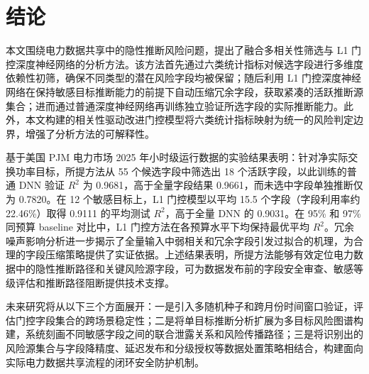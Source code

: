 \documentclass[UTF8,zihao=5,twoside]{ctexart}
\numberwithin{equation}{section}
\begin{document}
\section{结论}
本文围绕电力数据共享中的隐性推断风险问题，提出了融合多相关性筛选与 L1 门控深度神经网络的分析方法。该方法首先通过六类统计指标对候选字段进行多维度依赖性初筛，确保不同类型的潜在风险字段均被保留；随后利用 L1 门控深度神经网络在保持敏感目标推断能力的前提下自动压缩冗余字段，获取紧凑的活跃推断源集合；进而通过普通深度神经网络再训练独立验证所选字段的实际推断能力。此外，本文构建的相关性驱动改进门控模型将六类统计指标映射为统一的风险判定边界，增强了分析方法的可解释性。

基于美国 PJM 电力市场 2025 年小时级运行数据的实验结果表明：针对净实际交换功率目标，所提方法从 55 个候选字段中筛选出 18 个活跃字段，以此训练的普通 DNN 验证 $R^2$ 为 0.9681，高于全量字段结果 0.9661，而未选中字段单独推断仅为 0.7820。在 12 个敏感目标上，L1 门控模型以平均 15.5 个字段（字段利用率约 22.46\%）取得 0.9111 的平均测试 $R^2$，高于全量 DNN 的 0.9031。在 95\% 和 97\% 同预算 baseline 对比中，L1 门控方法在各预算水平下均保持最优平均 $R^2$。冗余噪声影响分析进一步揭示了全量输入中弱相关和冗余字段引发过拟合的机理，为合理的字段压缩策略提供了实证依据。上述结果表明，所提方法能够有效定位电力数据中的隐性推断路径和关键风险源字段，可为数据发布前的字段安全审查、敏感等级评估和推断路径阻断提供技术支撑。

未来研究将从以下三个方面展开：一是引入多随机种子和跨月份时间窗口验证，评估门控字段集合的跨场景稳定性；二是将单目标推断分析扩展为多目标风险图谱构建，系统刻画不同敏感字段之间的联合泄露关系和风险传播路径；三是将识别出的风险源集合与字段降精度、延迟发布和分级授权等数据处置策略相结合，构建面向实际电力数据共享流程的闭环安全防护机制。
\end{document}
